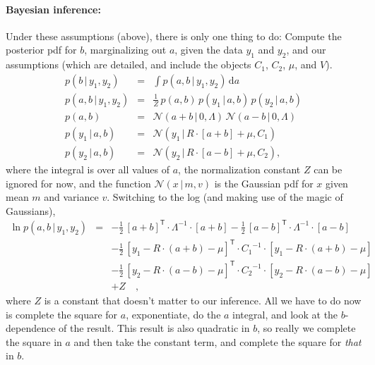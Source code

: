 \documentclass[12pt,letterpaper]{article}
\newcommand{\transpose}[1]{{#1}^{\mathsf{T}}}
\newcommand{\inverse}[1]{{#1}^{-1}}
\newcommand{\given}{\,|\,}
\newcommand{\dd}{\mathrm{d}}
\newcommand{\normal}{\mathcal{N}}
\begin{document}
\paragraph{Bayesian inference:}
Under these assumptions (above), there is only one thing to do:
Compute the posterior pdf for $b$, marginalizing out $a$, given the
data $y_1$ and $y_2$, and our assumptions (which are detailed, and
include the objects $C_1$, $C_2$, $\mu$, and $V$).
\begin{eqnarray}
p(b\given y_1,y_2) &=& \int p(a,b\given y_1,y_2)\,\dd a \\
p(a,b\given y_1,y_2) &=& \frac{1}{Z}\,p(a,b)\,p(y_1\given a,b)\,p(y_2\given a,b) \\
p(a,b) &=& \normal(a+b\given 0,\Lambda)\,\normal(a-b\given 0,\Lambda) \\
p(y_1\given a,b) &=& \normal(y_1\given R\cdot[a+b]+\mu,C_1) \\
p(y_2\given a,b) &=& \normal(y_2\given R\cdot[a-b]+\mu,C_2), \quad
\end{eqnarray}
where the integral is over all values of $a$, the normalization
constant $Z$ can be ignored for now, and the function $\normal(x\given
m,v)$ is the Gaussian pdf for $x$ given mean $m$ and variance
$v$. Switching to the log (and making use of the magic of Gaussians),
\begin{eqnarray}
\ln p(a,b\given y_1,y_2) &=&
  -\frac{1}{2}\,\transpose{[a+b]}\cdot\inverse{\Lambda}\cdot [a+b]
  -\frac{1}{2}\,\transpose{[a-b]}\cdot\inverse{\Lambda}\cdot [a-b] \nonumber\\
  &&
  -\frac{1}{2}\,\transpose{[y_1-R\cdot(a+b)-\mu]}\cdot\inverse{C_1}\cdot [y_1-R\cdot(a+b)-\mu] \nonumber\\
  &&
  -\frac{1}{2}\,\transpose{[y_2-R\cdot(a-b)-\mu]}\cdot\inverse{C_2}\cdot [y_2-R\cdot(a-b)-\mu] \nonumber\\
  &&
  + Z \quad ,
\end{eqnarray}
where $Z$ is a constant that doesn't matter to our inference. All we
have to do now is complete the square for $a$, exponentiate, do the
$a$ integral, and look at the $b$-dependence of the result.
This result is also quadratic in $b$, so really we complete the square
in $a$ and then take the constant term, and complete the square for
\emph{that} in $b$.
\end{document}

